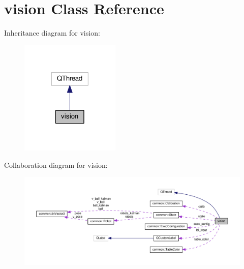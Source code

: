 \hypertarget{classvision}{}\section{vision Class Reference}
\label{classvision}


Inheritance diagram for vision\+:\nopagebreak
\begin{figure}[H]
\begin{center}
\leavevmode
\includegraphics[width=134pt]{classvision__inherit__graph}
\end{center}
\end{figure}


Collaboration diagram for vision\+:\nopagebreak
\begin{figure}[H]
\begin{center}
\leavevmode
\includegraphics[width=350pt]{classvision__coll__graph}
\end{center}
\end{figure}
